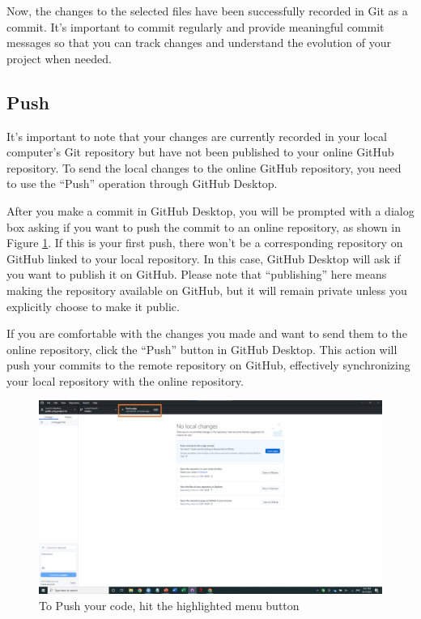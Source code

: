 \documentclass[
]{book}
\begin{document}
Now, the changes to the selected files have been successfully recorded in Git as a commit. It's important to commit regularly and provide meaningful commit messages so that you can track changes and understand the evolution of your project when needed.

\hypertarget{push}{%
\subsection{Push}\label{push}}

It's important to note that your changes are currently recorded in your local computer's Git repository but have not been published to your online GitHub repository. To send the local changes to the online GitHub repository, you need to use the ``Push'' operation through GitHub Desktop.

After you make a commit in GitHub Desktop, you will be prompted with a dialog box asking if you want to push the commit to an online repository, as shown in Figure \ref{fig:gitdesktop4}. If this is your first push, there won't be a corresponding repository on GitHub linked to your local repository. In this case, GitHub Desktop will ask if you want to publish it on GitHub. Please note that ``publishing'' here means making the repository available on GitHub, but it will remain private unless you explicitly choose to make it public.

If you are comfortable with the changes you made and want to send them to the online repository, click the ``Push'' button in GitHub Desktop. This action will push your commits to the remote repository on GitHub, effectively synchronizing your local repository with the online repository.

\begin{figure}

{\centering \includegraphics[width=61.11in]{image/git_image05} 

}

\caption{To Push your code, hit the highlighted menu button}\label{fig:gitdesktop4}
\end{figure}
\end{document}
